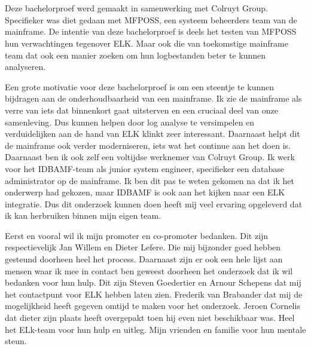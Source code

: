 
\chapter*{}%
\label{ch:voorwoord}


Deze bachelorproef werd gemaakt in samenwerking met Colruyt Group. Specifieker was diet gedaan met MFPOSS, een systeem beheerders team van de mainframe. De intentie van deze bachelorproef is deels het testen van MFPOSS hun verwachtingen tegenover ELK. Maar ook die van toekomstige mainframe team dat ook een manier zoeken om hun logbestanden beter te kunnen analyseren.

Een grote motivatie voor deze bachelorproef is om een steentje te kunnen bijdragen aan de onderhoudbaarheid van een mainframe. Ik zie de mainframe als verre van iets dat binnenkort gaat uitsterven en een cruciaal deel van onze samenleving. Dus kunnen helpen door log analyse te versimpelen en verduidelijken aan de hand van ELK klinkt zeer interessant. Daarnaast helpt dit de mainframe ook verder moderniseren, iets wat het continue aan het doen is. Daarnaast ben ik ook zelf een voltijdse werknemer van Colruyt Group. Ik werk voor het IDBAMF-team als junior system engineer, specifieker een database administrator op de mainframe. Ik ben dit pas te weten gekomen na dat ik het onderwerp had gekozen, maar IDBAMF is ook aan het kijken naar een ELK integratie. Dus dit onderzoek kunnen doen heeft mij veel ervaring opgeleverd dat ik kan herbruiken binnen mijn eigen team.

Eerst en vooral wil ik mijn promoter en co-promoter bedanken. Dit zijn respectievelijk Jan Willem en Dieter Lefere. Die mij bijzonder goed hebben gesteund doorheen heel het process. Daarnaast zijn er ook een hele lijst aan mensen waar ik mee in contact ben geweest doorheen het onderzoek dat ik wil bedanken voor hun hulp. Dit zijn Steven Goedertier en Arnour Schepens dat mij het contactpunt voor ELK hebben laten zien. Frederik van Brabander dat mij de mogelijkheid heeft gegeven omtijd te maken voor het onderzoek. Jeroen Cornelis dat dieter zijn plaats heeft overgepakt toen hij even niet beschikbaar was. Heel het ELk-team voor hun hulp en uitleg. Mijn vrienden en familie voor hun mentale steun.